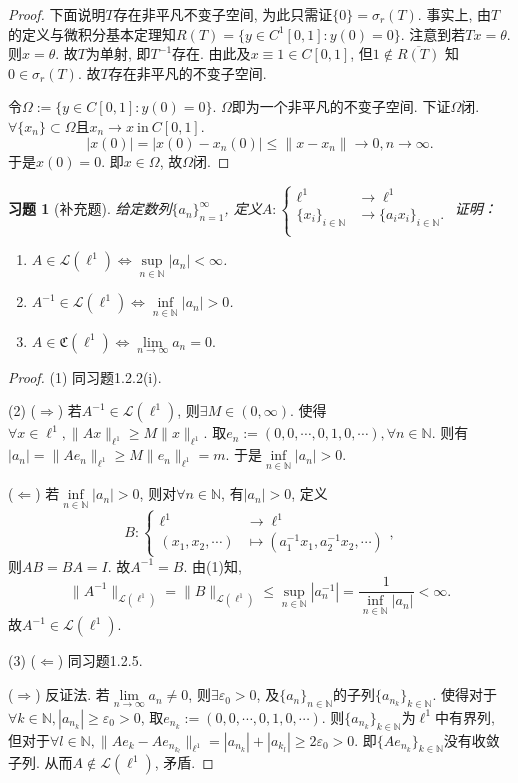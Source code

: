 \documentclass[UTF8,twoside]{ctexbook}
\newtheorem{exercise}{习题}[section]
\newcommand{\h}{\mathscr}
\newcommand{\kx}{\mathbb}
\numberwithin{equation}{section}
\begin{document}
\begin{proof}
		下面说明$T$存在非平凡不变子空间, 为此只需证$\{0\}=\sigma_r(T)$. 事实上, 由$T$的定义与微积分基本定理知$R(T)=\{y\in C^1[0,1]:y(0)=0\}$. 注意到若$Tx=\theta$. 则$x=\theta$. 故$T$为单射, 即$T^{-1}$存在. 由此及$x\equiv 1\in C[0,1]$, 但$1\notin\overline{R(T)}$ 知$0\in\sigma_r(T)$. 故$T$存在非平凡的不变子空间.

		令$\Omega:=\{y\in C[0,1]:y(0)=0\}$. $\Omega$即为一个非平凡的不变子空间. 下证$\Omega$闭. $\forall \{x_n\}\subset\Omega$且$x_n\rightarrow x\ \text{in}\ C[0,1]$.
		\[
		|x(0)|=|x(0)-x_n(0)|\leq\|x-x_n\|\rightarrow 0, n\rightarrow\infty.
		\]
		于是$x(0)=0$. 即$x\in\Omega$, 故$\Omega$闭.
	\end{proof}
	\begin{exercise}[补充题]
		给定数列$\{a_n\}_{n=1}^\infty$, 定义$A: \left\{
		\begin{aligned}
		\ell^1&\rightarrow \ell^1\\
		\{x_i\}_{i\in\kx N}&\rightarrow\{a_ix_i\}_{i\in\kx N}.\\
		\end{aligned}
		\right.$
		证明：
		\begin{enumerate}[(1)]
			\item$A\in\h L(\ell^1)\Longleftrightarrow \sup\limits_{n\in\kx N}|a_n|<\infty$.
			\item$A^{-1}\in\h L(\ell^1)\Longleftrightarrow \inf\limits_{n\in\kx N}|a_n|>0$.
			\item$A\in\mathfrak C(\ell^1)\Longleftrightarrow\lim\limits_{n\rightarrow\infty}a_n=0.$
		\end{enumerate}
	\end{exercise}
	\begin{proof}
		(1) 同习题1.2.2(i).

		(2) ($\Rightarrow$) 若$A^{-1}\in\h L(\ell^1)$, 则$\exists M\in(0,\infty)$. 使得$\forall x\in\ell^1,\|Ax\|_{\ell^1}\geq M\|x\|_{\ell^1}$. 取$e_n:=(0,0,\cdots,0,1,0,\cdots),\forall n\in\kx N$. 则有$|a_n|=\|Ae_n\|_{\ell^1}\geq M\|e_n\|_{\ell^1}=m$. 于是$\inf\limits_{n\in\kx N}|a_n|>0$.

		($\Leftarrow$) 若$\inf\limits_{n\in\kx N}|a_n|>0$, 则对$\forall n\in\kx N$, 有$|a_n|>0$, 定义
		\[
		B:\left\{
		\begin{aligned}
		\ell^1&\rightarrow\ell^1\\
		(x_1,x_2,\cdots)&\mapsto(a_1^{-1}x_1,a_2^{-1}x_2,\cdots)
		\end{aligned},
		\right.
		\]
		则$AB=BA=I$. 故$A^{-1}=B$. 由(1)知,
		\[\|A^{-1}\|_{\h L(\ell^1)}=\|B\|_{\h L(\ell^1)}\leq\sup_{n\in\kx N}|a_n^{-1}|=\frac{1}{\inf_{n\in\kx N}|a_n|}<\infty.
		\] 故$A^{-1}\in\h L(\ell^1)$.

		(3) ($\Leftarrow$) 同习题1.2.5.

		($\Rightarrow$) 反证法. 若$\lim\limits_{n\rightarrow\infty}a_n\neq 0$, 则$\exists \varepsilon_0>0$, 及$\{a_n\}_{n\in\kx N}$的子列$\{a_{n_k}\}_{k\in\kx N}$. 使得对于$\forall k\in\kx N, |a_{n_k}|\geq\varepsilon_0>0$, 取$e_{n_k}:=(0,0,\cdots,0,1,0,\cdots)$. 则$\{a_{n_k}\}_{k\in\kx N}$为$\ell^1$中有界列, 但对于$\forall l\in\kx N, \|Ae_k-Ae_{n_{k_l}}\|_{\ell^1}=|a_{n_k}|+|a_{k_l}|\geq 2\varepsilon_0>0$. 即$\{Ae_{n_k}\}_{k\in\kx N}$没有收敛子列. 从而$A\notin\h L(\ell^1)$, 矛盾.
	\end{proof}
\end{document}
